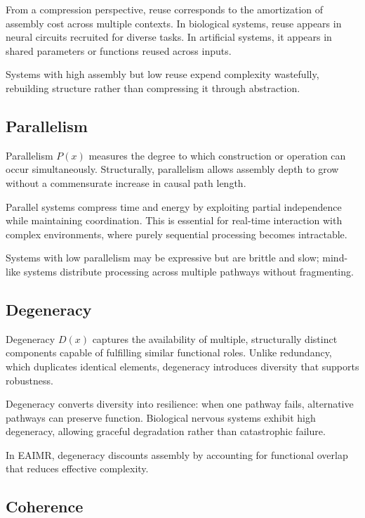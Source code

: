\documentclass[11pt,letterpaper]{article}
\begin{document}
From a compression perspective, reuse corresponds to the amortization of assembly cost across multiple contexts. In biological systems, reuse appears in neural circuits recruited for diverse tasks. In artificial systems, it appears in shared parameters or functions reused across inputs.

Systems with high assembly but low reuse expend complexity wastefully, rebuilding structure rather than compressing it through abstraction.

\subsection{Parallelism}

Parallelism $P(x)$ measures the degree to which construction or operation can occur simultaneously. Structurally, parallelism allows assembly depth to grow without a commensurate increase in causal path length.

Parallel systems compress time and energy by exploiting partial independence while maintaining coordination. This is essential for real-time interaction with complex environments, where purely sequential processing becomes intractable.

Systems with low parallelism may be expressive but are brittle and slow; mind-like systems distribute processing across multiple pathways without fragmenting.

\subsection{Degeneracy}

Degeneracy $D(x)$ captures the availability of multiple, structurally distinct components capable of fulfilling similar functional roles. Unlike redundancy, which duplicates identical elements, degeneracy introduces diversity that supports robustness.

Degeneracy converts diversity into resilience: when one pathway fails, alternative pathways can preserve function. Biological nervous systems exhibit high degeneracy, allowing graceful degradation rather than catastrophic failure.

In EAIMR, degeneracy discounts assembly by accounting for functional overlap that reduces effective complexity.

\subsection{Coherence}
\end{document}

